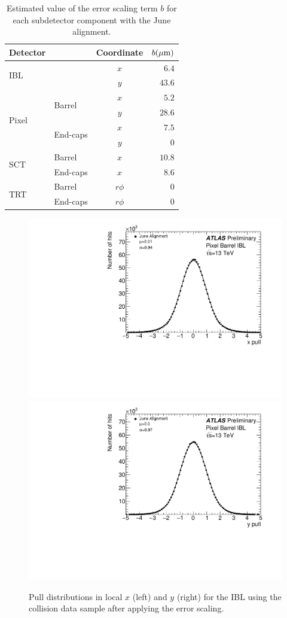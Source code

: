 \begin{table}[htbp]
  \centering
  \begin{tabular}{l l c r}
  Detector & & Coordinate & $b (\mu\textrm{m})$ \\
  \hline\hline
  \multirow{2}{*}{IBL} & & $x$ & $6.4$ \\
                       & & $y$ & $43.6$ \\
  \hline
  \multirow{4}{*}{Pixel} & \multirow{2}{*}{Barrel} & $x$ & $5.2$ \\
                         &                         & $y$ & $28.6$ \\
                         \cline{2-4}
                         & \multirow{2}{*}{End-caps} & $x$ & $7.5$ \\
                         &                         & $y$ & $0$ \\
  \hline
  \multirow{2}{*}{SCT} & Barrel&   $x$ & $10.8$ \\
                       & End-caps& $x$ & $8.6$ \\
  \hline
  \multirow{2}{*}{TRT} & Barrel&   $r\phi$ & $0$ \\
                       & End-caps& $r\phi$ & $0$ \\
  \hline
  \end{tabular}
  \caption{Estimated value of the error scaling term $b$ for each subdetector component with the June alignment.}
  \label{tab:align_error_scaling}
\end{table}

\begin{figure}[htbp]
  \centering
  \includegraphics[width=.48\textwidth]{figs/alignment/align2015/PIXPULLX0}
  \includegraphics[width=.48\textwidth]{figs/alignment/align2015/PIXPULLY0}
  \caption{Pull distributions in local $x$ (left) and $y$ (right) for the IBL using the  collision data sample after applying the error scaling.}
  \label{fig:align_pull_ibl}
\end{figure}

